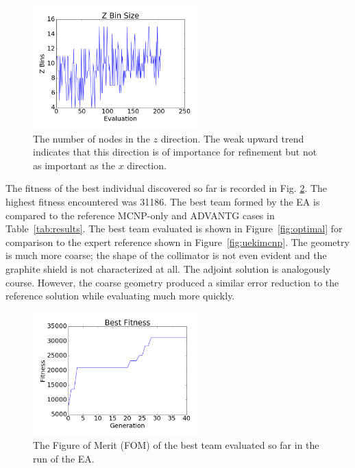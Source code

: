 \documentclass[conference]{IEEEtran}
\begin{document}
\begin{figure}[!t]
\centering
\includegraphics[width=2.5in]{zbinsize}
\caption{The number of nodes in the $z$ direction. The weak upward trend indicates that this direction is of importance for refinement but not as important as the $x$ direction.}
\label{fig:zbinsize}
\end{figure}

The fitness of the best individual discovered so far is recorded in Fig. \ref{fig:bestfitnessever}. The highest fitness encountered was 31186. The best team formed by the EA is compared to the reference MCNP-only and ADVANTG cases in Table~\ref{tab:results}. The best team evaluated is shown in Figure~\ref{fig:optimal} for comparison to the expert reference shown in Figure~\ref{fig:uekimcnp}. The geometry is much more coarse; the shape of the collimator is not even evident and the graphite shield is not characterized at all. The adjoint solution is analogously course. However, the coarse geometry produced a similar error reduction to the reference solution while evaluating much more quickly.

\begin{figure}[!t]
\centering
\includegraphics[width=2.5in]{bestfitever}
\caption{The Figure of Merit (FOM) of the best team evaluated so far in the run of the EA.}
\label{fig:bestfitnessever}
\end{figure}
\end{document}
